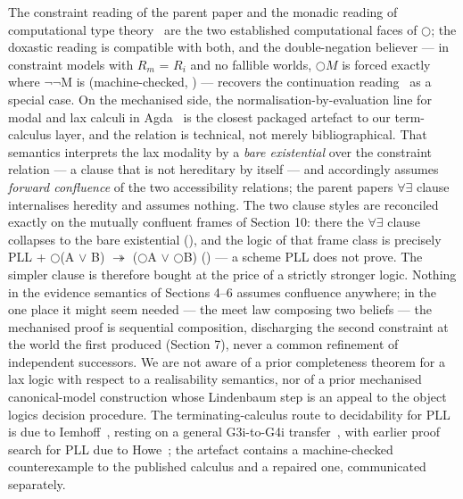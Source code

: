 The constraint reading of the parent paper and the monadic reading of
computational type theory~\cite{Moggi1991,BentonBiermanDePaiva1998} are
the two established computational faces
of \ensuremath{\bigcirc}; the doxastic reading is compatible with both, and the
double-negation believer --- in constraint models with \ensuremath{R_{m}} = \ensuremath{R_{i}} and no
fallible worlds, \ensuremath{\bigcirc M} is forced exactly where \ensuremath{\lnot\lnot}M is (machine-checked,
) --- recovers the continuation reading~\cite{Krivine2009} as a
special case. On the mechanised side, the normalisation-by-evaluation
line for modal and lax calculi in
Agda~\cite{ValliappanRuchTomeCortinas2022,Valliappan2026} is the
closest packaged artefact to our term-calculus layer, and the relation
is technical, not merely bibliographical. That semantics interprets
the lax modality by a \emph{bare existential} over the constraint
relation --- a clause that is not hereditary by itself --- and
accordingly assumes \emph{forward confluence} of the two accessibility
relations; the parent paper\textquotesingle s \ensuremath{\forall\exists} clause
internalises heredity and assumes nothing. The two clause styles are
reconciled exactly on the mutually confluent frames of Section 10:
there the \ensuremath{\forall\exists} clause collapses to the bare
existential (), and the
logic of that frame class is precisely PLL +
\ensuremath{\bigcirc}(A \ensuremath{\vee} B) \ensuremath{\twoheadrightarrow}
(\ensuremath{\bigcirc}A \ensuremath{\vee} \ensuremath{\bigcirc}B)
() --- a scheme PLL does not
prove. The simpler clause is therefore bought at the price of a
strictly stronger logic. Nothing in the evidence semantics of
Sections 4--6 assumes confluence anywhere; in the one place it might
seem needed --- the meet law composing two beliefs --- the mechanised
proof is sequential composition, discharging the second constraint at
the world the first produced (Section 7), never a common refinement of
independent successors. We are not aware
of a prior completeness theorem for a
lax logic with respect to a realisability semantics, nor of a prior
mechanised canonical-model construction whose Lindenbaum step is an
appeal to the object logic\textquotesingle s decision procedure. The
terminating-calculus route to decidability for PLL is due to
Iemhoff~\cite{Iemhoff2024}, resting on a general G3i-to-G4i
transfer~\cite{Iemhoff2022}, with earlier proof search for PLL due to
Howe~\cite{Howe2001}; the artefact contains a machine-checked
counterexample to the published calculus and a repaired one,
communicated separately.

